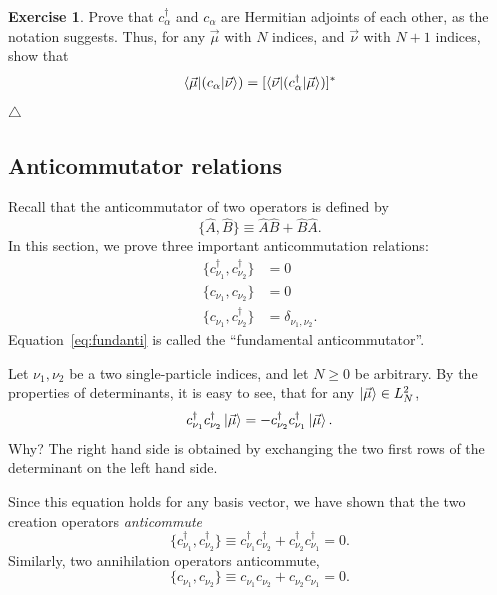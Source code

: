 \documentclass{report}
\theoremstyle{plain}
\theoremstyle{definition}
\newtheorem{exerc}{Exercise}[chapter]
\newcommand\xqed[1]{%
  \leavevmode\unskip\penalty9999 \hbox{}\nobreak\hfill
  \quad\hbox{#1}}
\newcommand\demo{\xqed{$\triangle$}}
\newenvironment{exercise}{\bigskip\begin{exerc}}{\demo\end{exerc}\bigskip}
\begin{document}
\begin{exercise}
  Prove that $c^\dag_\alpha$ and $c_\alpha$ are Hermitian adjoints of each
  other, as the notation suggests. Thus, for any $\vec{\mu}$ with $N$
  indices, and $\vec{\nu}$ with $N+1$ indices, show that
  \begin{equation}
    \braket{\vec{\mu}|(c_\alpha|\vec{\nu}}) =
    [\braket{\vec{\nu}|(c^\dag_\alpha|\vec{\mu}})]^*
  \end{equation}
\end{exercise}

\subsection{Anticommutator relations}

Recall that the anticommutator of two operators is defined by
\begin{equation}
  \{ \hat{A}, \hat{B} \} \equiv \hat{A}\hat{B} + \hat{B}\hat{A}.
\end{equation}
In this section, we prove three important anticommutation relations:
\begin{subequations}
  \label{eq:anticommutator-relations}
\begin{align}
  \{ c^\dag_{\nu_1}, c^\dag_{\nu_2} \} & = 0 \\
  \{ c_{\nu_1}, c_{\nu_2} \} & = 0 \\
  \{ c_{\nu_1}, c^\dag_{\nu_2} \} & = \delta_{\nu_1,\nu_2}. \label{eq:fundanti}
\end{align}
\end{subequations}
Equation~\eqref{eq:fundanti} is called the ``fundamental anticommutator''.

Let $\nu_1,\nu_2$ be a two single-particle indices, and let $N\geq 0$ be arbitrary.
By the properties of determinants, it is easy to see, that for any
$\ket{\vec{\mu}} \in L^2_N$,
\begin{equation}
  c^\dag_{\nu_1} c^\dag_{\nu_2} \ket{\vec{\mu}} = -c^\dag_{\nu_2}
  c^\dag_{\nu_1} \ket{\vec{\mu}}.
\end{equation}
Why? The right hand side is obtained by exchanging the two first rows
of the determinant on the left hand side.

Since this equation holds for any basis vector, we have shown that the
two creation operators \emph{anticommute}
\begin{equation}
  \{ c^\dag_{\nu_1}, c^\dag_{\nu_2} \} \equiv c^\dag_{\nu_1}
  c^\dag_{\nu_2} + c^\dag_{\nu_2} c^\dag_{\nu_1} = 0.
\end{equation}
Similarly, two annihilation operators anticommute,
\begin{equation}
  \{ c_{\nu_1}, c_{\nu_2} \} \equiv c_{\nu_1}
  c_{\nu_2} + c_{\nu_2} c_{\nu_1} = 0.
\end{equation}
\end{document}

